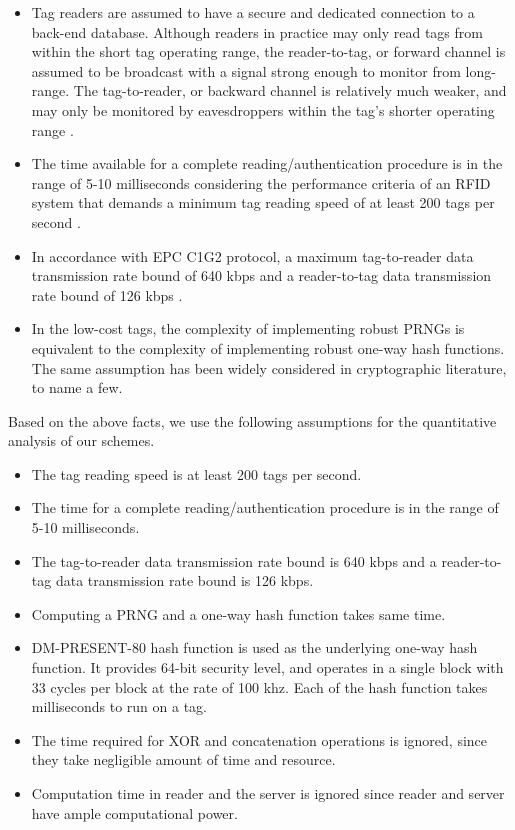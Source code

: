 \documentclass{easychair}
\begin{document}
 \begin{itemize}
\item Tag readers are assumed to have a secure and dedicated connection to a back-end database. Although
readers in practice may only read tags from within the short tag operating
range, the reader-to-tag, or forward channel is assumed to be broadcast with a signal
strong enough to monitor from long-range. The tag-to-reader, or
backward channel is relatively much weaker, and may only be monitored by eavesdroppers
within the tag's shorter operating range \cite{Weis}. 

\item The time available for a complete reading/authentication procedure is in the range of 5-10 milliseconds considering the performance criteria of an RFID system that demands a minimum tag reading speed of at least 200 tags per second \cite{AutoID}.

\item In accordance with EPC C1G2 protocol, a maximum tag-to-reader data transmission rate bound of 640 kbps and a reader-to-tag data transmission rate bound of 126 kbps \cite{AutoID}. 

\item In the low-cost tags, the complexity of implementing
robust PRNGs is equivalent to the complexity of
implementing robust one-way hash functions. The same assumption has been widely considered in cryptographic literature, \cite{menezes,weim,Tsudik} to name a few.

\end{itemize}


Based on the above facts, we use the following assumptions for the quantitative analysis of our schemes.

\begin{itemize}
\item The tag reading speed is at least 200 tags per second.
\item The time for a complete reading/authentication procedure is in the range of 5-10 milliseconds.
\item The tag-to-reader data transmission rate bound is 640 kbps and a reader-to-tag data transmission rate bound is 126 kbps.
\item Computing a PRNG and a one-way hash function takes same time. 
\item DM-PRESENT-80 hash function is used as the underlying one-way hash function. It provides 64-bit security level, and operates in a single block with 33 cycles per block at the rate of 100 khz. Each of the hash function takes  milliseconds to run on a tag. 
\item The time required for XOR and concatenation operations is ignored, since they take negligible amount of time and resource.
\item Computation time in reader and the server is ignored since reader and server have ample computational power. 
\end{itemize}
\end{document}
